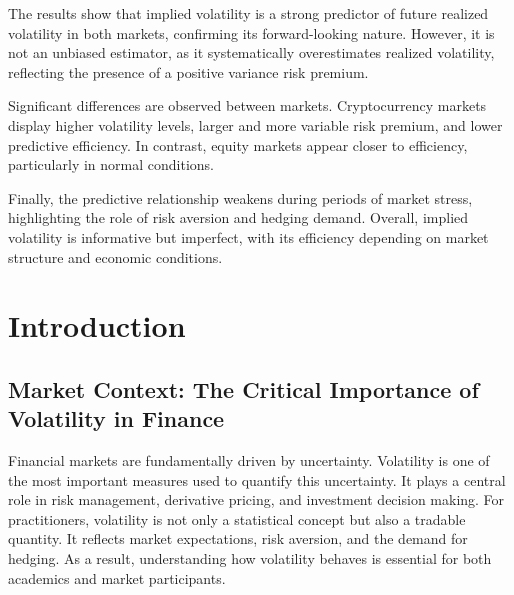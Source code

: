\documentclass[11pt,a4paper,openany]{report}
\begin{document}
The results show that implied volatility is a strong predictor of future
realized volatility in both markets, confirming its forward-looking
nature. However, it is not an unbiased estimator, as it systematically
overestimates realized volatility, reflecting the presence of a positive
variance risk premium.

Significant differences are observed between markets. Cryptocurrency
markets display higher volatility levels, larger and more variable risk
premium, and lower predictive efficiency. In contrast, equity markets
appear closer to efficiency, particularly in normal conditions.

Finally, the predictive relationship weakens during periods of market
stress, highlighting the role of risk aversion and hedging demand.
Overall, implied volatility is informative but imperfect, with its
efficiency depending on market structure and economic conditions.

\cleardoublepage
{\small\setlength{\parskip}{0pt}\tableofcontents}
\cleardoublepage
{\small\setlength{\parskip}{0pt}\listoftables}
\cleardoublepage

\setcounter{page}{1}

\chapter{Introduction}\label{introduction}

\section{Market Context: The Critical Importance of Volatility in
Finance}\label{market-context-the-critical-importance-of-volatility-in-finance}

Financial markets are fundamentally driven by uncertainty. Volatility is
one of the most important measures used to quantify this uncertainty. It
plays a central role in risk management, derivative pricing, and
investment decision making. For practitioners, volatility is not only a
statistical concept but also a tradable quantity. It reflects market
expectations, risk aversion, and the demand for hedging. As a result,
understanding how volatility behaves is essential for both academics and
market participants.
\end{document}
